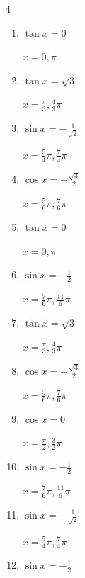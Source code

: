 \begin{multicols}{4}
\begin{enumerate}
        $\displaystyle x = \frac{3}{4}\pi , \frac{5}{4}\pi$

  \item $\displaystyle \tan{x}  = 0$

        $\displaystyle x = 0 , \pi$

  \item $\displaystyle \tan{x}  = \sqrt{3}$

        $\displaystyle x = \frac{\pi}{3} , \frac{4}{3}\pi$

  \item $\displaystyle \sin{x}  = -\frac{1}{\sqrt{2}}$

        $\displaystyle x = \frac{5}{4}\pi , \frac{7}{4}\pi$

  \item $\displaystyle \cos{x}  = -\frac{\sqrt{3}}{2}$

        $\displaystyle x = \frac{5}{6}\pi , \frac{7}{6}\pi$

  \item $\displaystyle \tan{x}  = 0$

        $\displaystyle x = 0 , \pi$

  \item $\displaystyle \sin{x}  = -\frac{1}{2}$

        $\displaystyle x = \frac{7}{6}\pi , \frac{11}{6}\pi$

  \item $\displaystyle \tan{x}  = \sqrt{3}$

        $\displaystyle x = \frac{\pi}{3} , \frac{4}{3}\pi$

  \item $\displaystyle \cos{x}  = -\frac{\sqrt{3}}{2}$

        $\displaystyle x = \frac{5}{6}\pi , \frac{7}{6}\pi$

  \item $\displaystyle \cos{x}  = 0$

        $\displaystyle x = \frac{\pi}{2} , \frac{3}{2}\pi$

  \item $\displaystyle \sin{x}  = -\frac{1}{2}$

        $\displaystyle x = \frac{7}{6}\pi , \frac{11}{6}\pi$

  \item $\displaystyle \sin{x}  = -\frac{1}{\sqrt{2}}$

        $\displaystyle x = \frac{5}{4}\pi , \frac{7}{4}\pi$

  \item $\displaystyle \sin{x}  = -\frac{1}{2}$


\end{enumerate}
\end{multicols}
